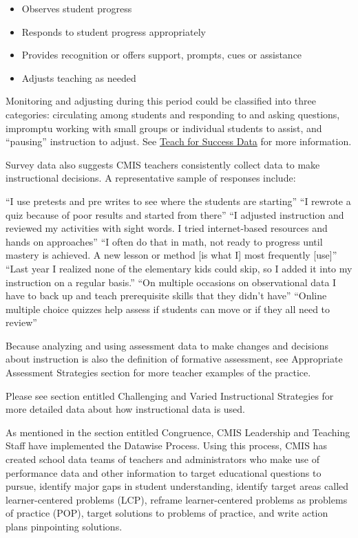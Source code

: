 \begin{findings}
\begin{itemize}
\item Observes student progress
\item Responds to student progress appropriately
\item Provides recognition or offers support, prompts, cues or assistance
\item Adjusts teaching as needed
\end{itemize}

Monitoring and adjusting during this period could be classified into three categories: circulating among students and responding to and asking questions, impromptu working with small groups or individual students to assist, and “pausing” instruction to adjust. See \href{https://docs.google.com/a/cmis.ac.th/document/d/1cRvL50iIDvo8s1Gnxoczm82LhSVmEOvCrFksxzHD7ko/edit?usp=sharing}{Teach for Success Data} for more information. 

Survey data also suggests CMIS teachers consistently collect data to make instructional decisions. A representative sample of responses include:

``I use pretests and pre writes to see where the students are starting'' 
``I rewrote a quiz because of poor results and started from there''
``I adjusted instruction and reviewed my activities with sight words. I tried internet-based resources and hands on approaches''
``I often do that in math, not ready to progress until mastery is achieved. A new lesson or method [is what I] most frequently [use]''
``Last year I realized none of the elementary kids could skip, so I added it into my instruction on a regular basis.''
``On multiple occasions on observational data I have to back up and teach prerequisite skills that they didn’t have'' 
``Online multiple choice quizzes help assess if students can move or if they all need to review''

Because analyzing and using assessment data to make changes and decisions about instruction is also the definition of formative assessment, see Appropriate Assessment Strategies section for more teacher examples of the practice. 

Please see section entitled Challenging and Varied Instructional Strategies for more detailed data about how instructional data is used.


As mentioned in the section entitled Congruence, CMIS Leadership and Teaching Staff have implemented the Datawise Process. Using this process, CMIS has created school data teams of teachers and administrators who make use of performance data and other information to target educational questions to pursue, identify major gaps in student understanding, identify target areas called learner-centered problems (LCP), reframe learner-centered problems as problems of practice (POP), target solutions to problems of practice, and write action plans pinpointing solutions. 


\end{findings}
